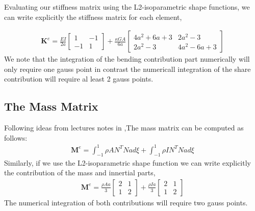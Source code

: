 \documentclass[10pt,twoside,a4paper]{article}
\renewcommand{\vec}[1]{\mathbf{#1}}
\begin{document}
Evaluating our stiffness matrix using the L2-isoparametric shape functions, we can write explicitly the stiffness matrix for each element,  

\begin{align}
 \vec{K}^e = \frac{EI}{2a} 
 \begin{bmatrix}
  1 & -1 \\
  -1 & 1
 \end{bmatrix} +
 \frac{\kappa GA}{6a}
 \begin{bmatrix}
  4a^2+6a+3 & 2a^2-3 \\
  2a^2-3 & 4a^2-6a+3
 \end{bmatrix}
\end{align}
We note that the integration of the bending contribution part numerically will only require one gauss point in contrast the numericall integration of the share contribution will require al least 2 gauss points.

\subsection{The Mass Matrix}
Following ideas from lectures notes in \cite{Chen2013},The mass matrix can be computed as follows:
\begin{align}
\vec{M}^e = \int_{-1}^{1} \rho A N^T N a d\xi
	  + \int_{-1}^{1} \rho I N^T N a d\xi
\label{eq:mass_matrix}
\end{align}
Similarly, if we use the L2-isoparametric shape function we can write explicitly the contribution of the mass and innertial parts,
\begin{align}
\vec{M}^e = \frac{\rho A a}{3}
 \begin{bmatrix}
  2 & 1 \\
  1 & 2 
 \end{bmatrix} +
 \frac{\rho I a}{3}
 \begin{bmatrix}
  2 & 1 \\
  1 & 2 
 \end{bmatrix}
\end{align}
The numerical integration of both contributions will require two gauss points.
\end{document}
